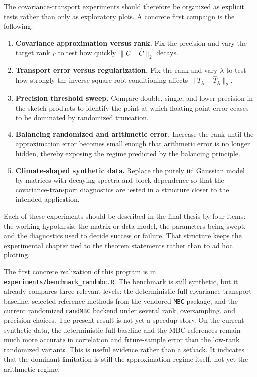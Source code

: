 The covariance-transport experiments should therefore be organized as explicit
tests rather than only as exploratory plots. A concrete first campaign is the
following.
\begin{enumerate}
	\item \textbf{Covariance approximation versus rank.} Fix the precision and vary the
	      target rank \(r\) to test how quickly \(\|C - \widehat C\|_2\) decays.
	\item \textbf{Transport error versus regularization.} Fix the rank and vary
	      \(\lambda\) to test how strongly the inverse-square-root conditioning affects
	      \(\|T_\lambda - \widehat T_\lambda\|_2\).
	\item \textbf{Precision threshold sweep.} Compare double, single, and lower
	      precision in the sketch products to identify the point at which
	      floating-point error ceases to be dominated by randomized truncation.
	\item \textbf{Balancing randomized and arithmetic error.} Increase the rank until
	      the approximation error becomes small enough that arithmetic error is no
	      longer hidden, thereby exposing the regime predicted by the balancing
	      principle.
	\item \textbf{Climate-shaped synthetic data.} Replace the purely iid Gaussian model
	      by matrices with decaying spectra and block dependence so that the
	      covariance-transport diagnostics are tested in a structure closer to the
	      intended application.
\end{enumerate}

Each of these experiments should be described in the final thesis by four items:
the working hypothesis, the matrix or data model, the parameters being swept, and
the diagnostics used to decide success or failure. That structure keeps the
experimental chapter tied to the theorem statements rather than to ad hoc plotting.

The first concrete realization of this program is in
\texttt{experiments/benchmark\_randmbc.R}. The benchmark is still synthetic,
but it already compares three relevant levels: the deterministic full
covariance-transport baseline, selected reference methods from the vendored
\texttt{MBC} package, and the current randomized \texttt{randMBC} backend under
several rank, oversampling, and precision choices. The present result is not yet a
speedup story. On the current synthetic data, the deterministic full baseline and
the MBC references remain much more accurate in correlation and future-sample
error than the low-rank randomized variants. This is useful evidence rather than a
setback. It indicates that the dominant limitation is still the approximation regime
itself, not yet the arithmetic regime.

